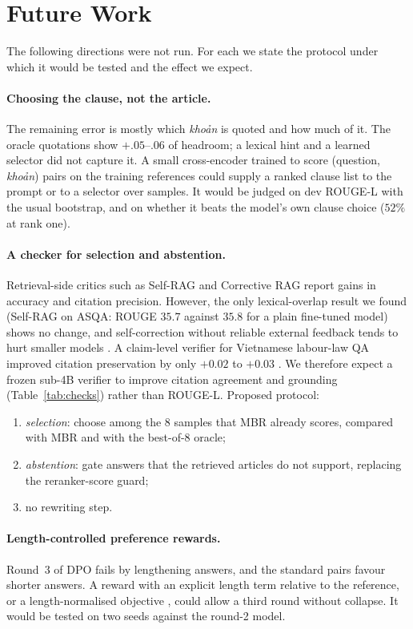 \documentclass[11pt,a4paper]{article}
\newcommand{\rl}{ROUGE-L}
\begin{document}
\section{Future Work}\label{sec:future}
The following directions were not run. For each we state the protocol under which it would be tested and the effect we expect.

\paragraph{Choosing the clause, not the article.}
The remaining error is mostly which \textit{khoản} is quoted and how much of it. The oracle quotations show $+.05$--$.06$ of headroom; a lexical hint and a learned selector did not capture it. A small cross-encoder trained to score (question, \textit{khoản}) pairs on the training references could supply a ranked clause list to the prompt or to a selector over samples. It would be judged on dev \rl{} with the usual bootstrap, and on whether it beats the model's own clause choice ($52\%$ at rank one).

\paragraph{A checker for selection and abstention.}
Retrieval-side critics such as Self-RAG \cite{selfrag} and Corrective RAG \cite{crag} report gains in accuracy and citation precision. However, the only lexical-overlap result we found (Self-RAG on ASQA: ROUGE $35.7$ against $35.8$ for a plain fine-tuned model) shows no change, and self-correction without reliable external feedback tends to hurt smaller models \cite{selfcorrect,kamoi}. A claim-level verifier for Vietnamese labour-law QA improved citation preservation by only $+0.02$ to $+0.03$ \cite{nllp26}. We therefore expect a frozen sub-4B verifier to improve citation agreement and grounding (Table~\ref{tab:checks}) rather than \rl{}. Proposed protocol:
\begin{enumerate}[leftmargin=*,label=(\roman*)]
\item \emph{selection}: choose among the $8$ samples that MBR already scores, compared with MBR and with the best-of-$8$ oracle;
\item \emph{abstention}: gate answers that the retrieved articles do not support, replacing the reranker-score guard;
\item no rewriting step.
\end{enumerate}

\paragraph{Length-controlled preference rewards.}
Round~3 of DPO fails by lengthening answers, and the standard pairs favour shorter answers. A reward with an explicit length term relative to the reference, or a length-normalised objective \cite{simpo}, could allow a third round without collapse. It would be tested on two seeds against the round-2 model.
\end{document}
